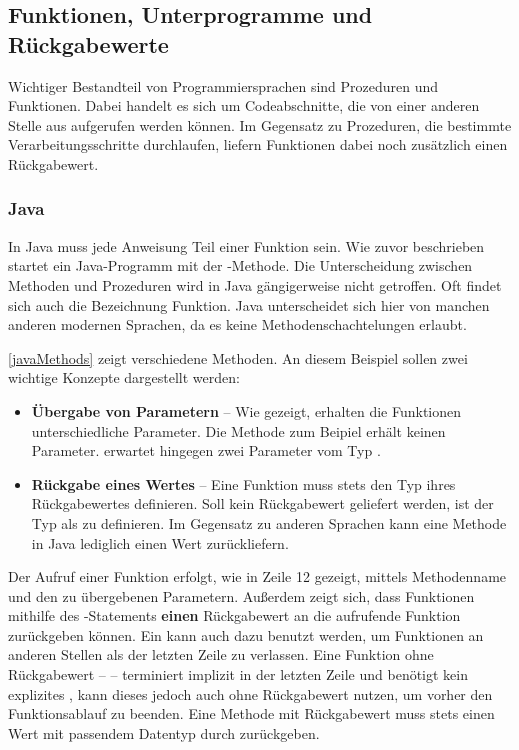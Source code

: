 \subsection{Funktionen, Unterprogramme und Rückgabewerte}\label{sec:functionsAndReturnValues}
Wichtiger Bestandteil von Programmiersprachen sind Prozeduren und Funktionen. Dabei handelt es sich um Codeabschnitte, die von einer anderen Stelle aus aufgerufen werden können. Im Gegensatz zu Prozeduren, die bestimmte Verarbeitungsschritte durchlaufen, liefern Funktionen dabei noch zusätzlich einen Rückgabewert.

\subsubsection*{Java}
In Java muss jede Anweisung Teil einer Funktion sein. Wie zuvor beschrieben startet ein Java-Programm mit der -Methode. Die Unterscheidung zwischen Methoden und Prozeduren wird in Java gängigerweise nicht getroffen. Oft findet sich auch die Bezeichnung Funktion. Java unterscheidet sich hier von manchen anderen modernen Sprachen, da es keine Methodenschachtelungen erlaubt.

\autoref{javaMethods} zeigt verschiedene Methoden. An diesem Beispiel sollen zwei wichtige Konzepte dargestellt werden: 
\begin{itemize}
    \item \textbf{Übergabe von Parametern} -- Wie gezeigt, erhalten die Funktionen unterschiedliche Parameter. Die Methode  zum Beipiel erhält keinen Parameter.  erwartet hingegen zwei Parameter vom Typ .
    \item \textbf{Rückgabe eines Wertes} -- Eine Funktion muss stets den Typ ihres Rückgabewertes definieren. Soll kein Rückgabewert geliefert werden, ist der Typ als  zu definieren. Im Gegensatz zu anderen Sprachen kann eine Methode in Java lediglich einen Wert zurückliefern.
\end{itemize}


Der Aufruf einer Funktion erfolgt, wie in Zeile 12 gezeigt, mittels Methodenname und den zu übergebenen Parametern. Außerdem zeigt sich, dass Funktionen mithilfe des -Statements \textbf{einen} Rückgabewert an die aufrufende Funktion zurückgeben können. Ein  kann auch dazu benutzt werden, um Funktionen an anderen Stellen als der letzten Zeile zu verlassen. Eine Funktion ohne Rückgabewert --  -- terminiert implizit in der letzten Zeile und benötigt kein explizites , kann dieses jedoch auch ohne Rückgabewert nutzen, um vorher den Funktionsablauf zu beenden. Eine Methode mit Rückgabewert muss stets einen Wert mit passendem Datentyp durch  zurückgeben.

